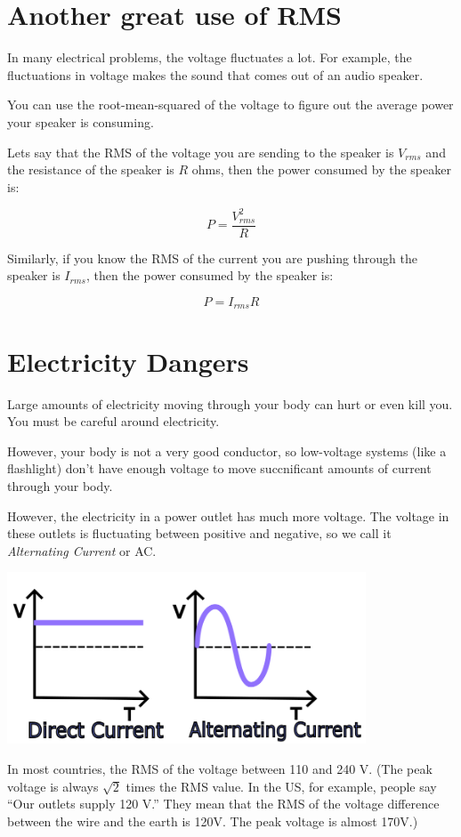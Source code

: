 \section{Another great use of RMS}

In many electrical problems, the voltage fluctuates a lot.  For
example, the fluctuations in voltage makes the sound that comes out of an
audio speaker.

You can use the root-mean-squared of the voltage to figure out the average power
your speaker is consuming.

Lets say that the RMS of the voltage you are sending to the speaker is $V_{rms}$
and the resistance of the speaker is $R$ ohms, then the power consumed
by the speaker is:

$$P = \frac{V_{rms}^2}{R}$$

Similarly, if you know the RMS of the current you are pushing through
the speaker is $I_{rms}$, then the power consumed by the speaker is:

$$P = I_{rms} R$$

\section{Electricity Dangers}

Large amounts of electricity moving through your body can hurt or even kill
you. You must be careful around electricity.

However, your body is not a very good conductor, so low-voltage
systems (like a flashlight) don't have enough voltage to move succnificant amounts of
current through your body.

However, the  electricity in a power outlet has much more voltage. The voltage
in these outlets is fluctuating between positive and negative, so we
call it \textit{Alternating Current} or AC.

\includegraphics[width=0.8\textwidth]{AC_vs_DC.png}

In most countries, the RMS of the voltage between 110 and 240 V. (The
peak voltage is always $\sqrt{2}$ times the RMS value. In the US, for
example, people say ``Our outlets supply 120 V.'' They mean that the
RMS of the voltage difference between the wire and the earth is 120V.
The peak voltage is almost 170V.)

